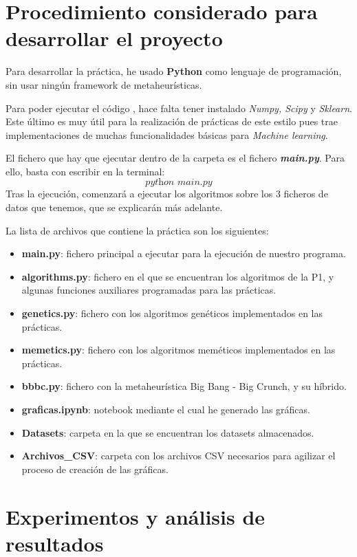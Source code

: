 \documentclass[10pt, a4paper]{article}
\theoremstyle{theorem-style}
\theoremstyle{theorem-style}
\theoremstyle{theorem2-style}
\theoremstyle{definition-style}
\theoremstyle{remark-style}
\theoremstyle{example-style}
\theoremstyle{definition-style}
\theoremstyle{remark-style}
\theoremstyle{remark-style}
\begin{document}
\newpage
\section{Procedimiento considerado para desarrollar el proyecto}
Para desarrollar la práctica, he usado \textbf{Python} como lenguaje de programación, sin usar ningún framework de metaheurísticas.

Para poder ejecutar el código , hace falta tener instalado \emph{Numpy, Scipy} y \emph{Sklearn}. Este último es muy útil para la realización de prácticas de este estilo pues trae implementaciones de muchas funcionalidades básicas para \emph{Machine learning}.

El fichero que hay que ejecutar dentro de la carpeta es el fichero \emph{\textbf{main.py}}. Para ello, basta con escribir en la terminal:
\[
\textit{python main.py}
\]
Tras la ejecución, comenzará a ejecutar los algoritmos sobre los 3 ficheros de datos que tenemos, que se explicarán más adelante.

La lista de archivos que contiene la práctica son los siguientes:
\begin{itemize}
	\item \textbf{main.py}: fichero principal a ejecutar para la ejecución de nuestro programa.	
	\item \textbf{algorithms.py}: fichero en el que se encuentran los algoritmos de la P1, y algunas funciones auxiliares programadas para las prácticas.

\item \textbf{genetics.py}: fichero con los algoritmos genéticos implementados en las prácticas.
\item \textbf{memetics.py}: fichero con los algoritmos meméticos implementados en las prácticas.

\item \textcolor{ugrColor}{\textbf{bbbc.py}: fichero con la metaheurística Big Bang - Big Crunch, y su híbrido.}
 
	\item \textcolor{ugrColor}{\textbf{graficas.ipynb}: notebook mediante el cual he generado las gráficas.}  
	\item \textbf{Datasets}: carpeta en la que se encuentran los datasets almacenados.
	\item \textbf{Archivos\_CSV}: carpeta con los archivos CSV necesarios para agilizar el proceso de creación de las gráficas.
	
\end{itemize}
\newpage
\section{Experimentos y análisis de resultados}
\end{document}
